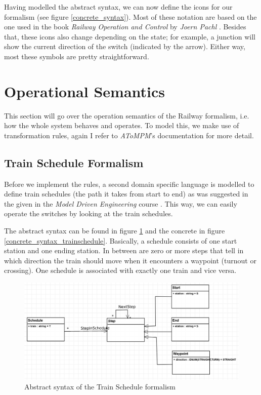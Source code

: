 \documentclass{article}
\begin{document}
Having modelled the abstract syntax, we can now define the icons for our formalism (see figure \ref{concrete_syntax}). Most of these notation are based on the one used in the book \textit{Railway Operation and Control} by \textit{Joern Pachl} \cite{railway_book}. Besides that, these icons also change depending on the state; for example, a junction will show the current direction of the switch (indicated by the arrow). Either way, most these symbols are pretty straightforward.

\section{Operational Semantics}

This section will go over the operation semantics of the Railway formalism, i.e. how the whole system behaves and operates. To model this, we make use of transformation rules, again I refer to \textit{AToMPM}'s documentation \cite{atompm_docs} for more detail.

\subsection{Train Schedule Formalism}

Before we implement the rules, a second domain specific language is modelled to define train schedules (the path it takes from start to end) as was suggested in the \cite{assignments} given in the \textit{Model Driven Engineering} course \cite{assignments}. This way, we can easily operate the switches by looking at the train schedules.

The abstract syntax can be found in figure \ref{abstract_syntax_trainschedule} and the concrete in figure \ref{concrete_syntax_trainschedule}. Basically, a schedule consists of one start station and one ending station. In between are zero or more steps that tell in which direction the train should move when it encounters a waypoint (turnout or crossing). One schedule is associated with  exactly one train and vice versa.

\begin{figure}[H]
    \centering
    \includegraphics[width=\textwidth]{images/trainschedule_abstract_syntax.png}
    \caption{Abstract syntax of the Train Schedule formalism}
    \label{abstract_syntax_trainschedule}
\end{figure}
\end{document}
